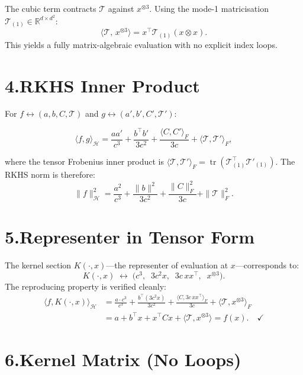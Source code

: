\documentclass[11pt]{article}
\begin{document}
The cubic term contracts $\mathcal{T}$ against $x^{\otimes 3}$.
Using the mode-1 matricisation $\mathcal{T}_{(1)}\in\mathbb{R}^{d\times d^2}$:
\[
  \langle \mathcal{T},\,x^{\otimes 3}\rangle
  = x^\top \mathcal{T}_{(1)}(x\otimes x).
\]
This yields a fully matrix-algebraic evaluation with no explicit index loops.

\section*{4.\quad RKHS Inner Product}

For $f\leftrightarrow(a,b,C,\mathcal{T})$ and
$g\leftrightarrow(a',b',C',\mathcal{T}')$:
\begin{mathbox}
\[
  \langle f,g\rangle_{\mathcal{H}}
  = \frac{aa'}{c^3}
  + \frac{b^\top b'}{3c^2}
  + \frac{\langle C,C'\rangle_F}{3c}
  + \langle\mathcal{T},\mathcal{T}'\rangle_F,
\]
\end{mathbox}
where the tensor Frobenius inner product is
$\langle\mathcal{T},\mathcal{T}'\rangle_F
 =\operatorname{tr}(\mathcal{T}_{(1)}^\top\mathcal{T}'_{(1)})$.
The RKHS norm is therefore:
\[
  \|f\|_{\mathcal{H}}^2
  = \frac{a^2}{c^3}
  + \frac{\|b\|^2}{3c^2}
  + \frac{\|C\|_F^2}{3c}
  + \|\mathcal{T}\|_F^2.
\]

\section*{5.\quad Representer in Tensor Form}

The kernel section $K(\cdot,x)$---the representer of evaluation at
$x$---corresponds to:
\[
  K(\cdot,x)\;\leftrightarrow\;
  \bigl(c^3,\;\;3c^2 x,\;\;3c\,xx^\top,\;\;x^{\otimes 3}\bigr).
\]
The reproducing property is verified cleanly:
\begin{align*}
  \langle f,K(\cdot,x)\rangle_{\mathcal{H}}
  &= \frac{a\cdot c^3}{c^3}
   + \frac{b^\top(3c^2 x)}{3c^2}
   + \frac{\langle C,3c\,xx^\top\rangle_F}{3c}
   + \langle\mathcal{T},x^{\otimes 3}\rangle_F\\[4pt]
  &= a + b^\top x + x^\top Cx + \langle\mathcal{T},x^{\otimes 3}\rangle
   = f(x).\quad\checkmark
\end{align*}

\section*{6.\quad Kernel Matrix (No Loops)}
\end{document}
